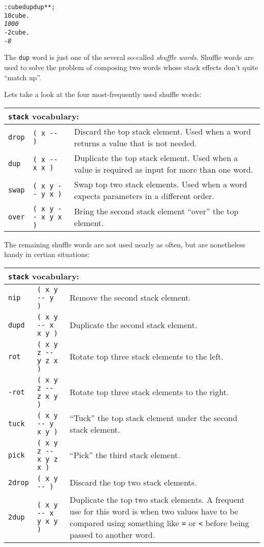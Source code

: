 \documentclass[english]{book}
\newcommand{\wordtable}[1]{{
\begin{tabularx}{12cm}{|l l X|}
#1
\hline
\end{tabularx}}}
\newcommand{\tabvocab}[1]{
\hline
\multicolumn{3}{|l|}{
\rule[-2mm]{0mm}{6mm}
\texttt{#1} vocabulary:}
\\
\hline
}
\begin{document}
\begin{alltt}
: cube dup dup {*} {*} ;
10 cube .
\emph{1000}
-2 cube .
\emph{-8}
\end{alltt}

The \texttt{dup} word is just one of the several so-called \emph{shuffle words}. Shuffle words are used to solve the problem of composing two words whose stack effects don't quite {}``match up''.

Lets take a look at the four most-frequently used shuffle words:

\wordtable{
\tabvocab{stack}
\texttt{drop}&
\texttt{( x -{}- )}&
Discard the top stack element. Used when
a word returns a value that is not needed.\\
\texttt{dup}&
\texttt{( x -{}- x x )}&
Duplicate the top stack element. Used
when a value is required as input for more than one word.\\
\texttt{swap}&
\texttt{( x y -{}- y x )}&
Swap top two stack elements. Used when
a word expects parameters in a different order.\\
\texttt{over}&
\texttt{( x y -{}- x y x )}&
Bring the second stack element {}``over''
the top element.\\}

The remaining shuffle words are not used nearly as often, but are nonetheless handy in certian situations:

\wordtable{
\tabvocab{stack}
\texttt{nip}&
\texttt{( x y -{}- y )}&
Remove the second stack element.\\
\texttt{dupd}&
\texttt{( x y -{}- x x y )}&
Duplicate the second stack element.\\
\texttt{rot}&
\texttt{( x y z -{}- y z x )}&
Rotate top three stack elements
to the left.\\
\texttt{-rot}&
\texttt{( x y z -{}- z x y )}&
Rotate top three stack elements
to the right.\\
\texttt{tuck}&
\texttt{( x y -{}- y x y )}&
``Tuck'' the top stack element under
the second stack element.\\
\texttt{pick}&
\texttt{( x y z -{}- x y z x )}&
``Pick'' the third stack element.\\
\texttt{2drop}&
\texttt{( x y -{}- )}&
Discard the top two stack elements.\\
\texttt{2dup}&
\texttt{( x y -{}- x y x y )}&
Duplicate the top two stack elements. A frequent use for this word is when two values have to be compared using something like \texttt{=} or \texttt{<} before being passed to another word.\\
}
\end{document}
